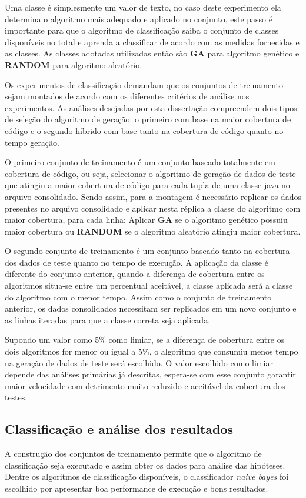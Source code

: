 \documentclass[
	12pt,				%
	oneside,			%
	a4paper,			%
	english,			%
	brazil				%
	]{abntex2ppgsi}
\begin{document}
Uma classe é simplesmente um valor de texto, no caso deste experimento ela determina o algoritmo mais adequado e aplicado no conjunto, este passo é importante para que o algoritmo de classificação saiba o conjunto de classes disponíveis no total e aprenda a classificar de acordo com as medidas fornecidas e as classes. As classes adotadas utilizadas então são \textbf{GA} para algoritmo genético e \textbf{RANDOM} para algoritmo aleatório.

Os experimentos de classificação demandam que os conjuntos de treinamento sejam montados de acordo com os diferentes critérios de análise nos experimentos. As análises desejadas por esta dissertação compreendem dois tipos de seleção do algoritmo de geração: o primeiro com base na maior cobertura de código e o segundo híbrido com base tanto na cobertura de código quanto no tempo geração.

O primeiro conjunto de treinamento é um conjunto baseado totalmente em cobertura de código, ou seja, selecionar o algoritmo de geração de dados de teste que atingiu a maior cobertura de código para cada tupla de uma classe java no arquivo consolidado. Sendo assim, para a montagem é necessário replicar os dados presentes no arquivo consolidado e aplicar nesta réplica a classe do algoritmo com maior cobertura, para cada linha: Aplicar \textbf{GA}  se o algoritmo genético possuiu  maior cobertura ou \textbf{RANDOM} se o algoritmo aleatório atingiu maior cobertura.

O segundo conjunto de treinamento é um conjunto baseado tanto na cobertura dos dados de teste quanto no tempo de execução. A aplicação da classe é diferente do conjunto anterior, quando a diferença de cobertura entre os algoritmos situa-se entre um percentual aceitável, a classe aplicada será a classe do algoritmo com o menor tempo. Assim como o conjunto de treinamento anterior, os dados consolidados necessitam ser replicados em um novo conjunto e as linhas iteradas para que a classe correta seja aplicada.

Supondo um valor como 5\% como limiar, se a diferença de cobertura entre os dois algoritmos for menor ou igual a 5\%, o algoritmo que consumiu menos tempo na geração de dados de teste será escolhido. O valor escolhido como limiar depende das análises primárias já descritas, espera-se com esse conjunto garantir maior velocidade com detrimento muito reduzido e aceitável da cobertura dos testes.

\subsection{Classificação e análise dos resultados}
A construção dos conjuntos de treinamento permite que o algoritmo de classificação seja executado e assim obter os dados para análise das hipóteses. Dentre os algoritmos de classificação disponíveis, o classificador \textit{naive bayes} foi escolhido por apresentar boa performance de execução e bons resultados.
\end{document}
